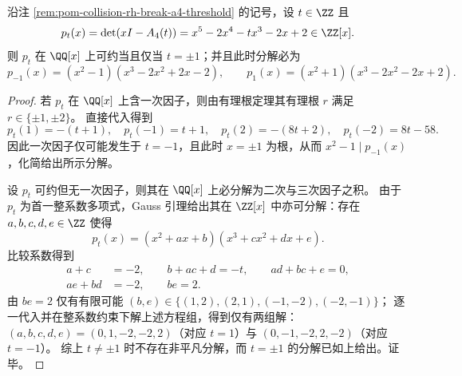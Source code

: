 
\begin{proposition}[整参数特征多项式的有理可约性仅在 \texorpdfstring{$t=\pm1$}{t=±1} 处发生]\label{prop:pom-a4t-charpoly-rational-reducibility}
沿注 \ref{rem:pom-collision-rh-break-a4-threshold} 的记号，设 \(t\in\ZZ\) 且
\[
p_t(x)=\det(xI-A_4(t))=x^5-2x^4-tx^3-2x+2\in\ZZ[x].
\]
则 \(p_t\) 在 \(\QQ[x]\) 上可约当且仅当 \(t=\pm1\)；并且此时分解必为
\[
p_{-1}(x)=(x^2-1)(x^3-2x^2+2x-2),\qquad
p_{1}(x)=(x^2+1)(x^3-2x^2-2x+2).
\]
\end{proposition}
\begin{proof}
若 \(p_t\) 在 \(\QQ[x]\) 上含一次因子，则由有理根定理其有理根 \(r\) 满足 \(r\in\{\pm1,\pm2\}\)。
直接代入得到
\[
p_t(1)=-(t+1),\quad p_t(-1)=t+1,\quad p_t(2)=-(8t+2),\quad p_t(-2)=8t-58.
\]
因此一次因子仅可能发生于 \(t=-1\)，且此时 \(x=\pm1\) 为根，从而 \(x^2-1\mid p_{-1}(x)\)，化简给出所示分解。
\par
设 \(p_t\) 可约但无一次因子，则其在 \(\QQ[x]\) 上必分解为二次与三次因子之积。
由于 \(p_t\) 为首一整系数多项式，Gauss 引理给出其在 \(\ZZ[x]\) 中亦可分解：存在 \(a,b,c,d,e\in\ZZ\) 使得
\[
p_t(x)=(x^2+ax+b)(x^3+cx^2+dx+e).
\]
比较系数得到
\[
\begin{aligned}
a+c&=-2,\qquad
b+ac+d=-t,\qquad
ad+bc+e=0,\\
ae+bd&=-2,\qquad
be=2.
\end{aligned}
\]
由 \(be=2\) 仅有有限可能 \((b,e)\in\{(1,2),(2,1),(-1,-2),(-2,-1)\}\)；
逐一代入并在整系数约束下解上述方程组，得到仅有两组解：
\((a,b,c,d,e)=(0,1,-2,-2,2)\)（对应 \(t=1\)）与 \((0,-1,-2,2,-2)\)（对应 \(t=-1\)）。
综上 \(t\neq\pm1\) 时不存在非平凡分解，而 \(t=\pm1\) 的分解已如上给出。证毕。
\end{proof}

